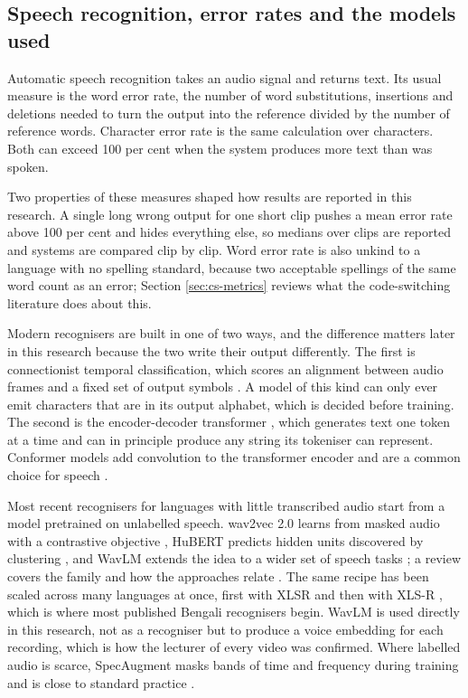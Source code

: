 \subsection{Speech recognition, error rates and the models used}

Automatic speech recognition takes an audio signal and returns text. Its usual measure is
the word error rate, the number of word substitutions, insertions and deletions needed to
turn the output into the reference divided by the number of reference words. Character
error rate is the same calculation over characters. Both can exceed 100 per cent when the
system produces more text than was spoken.

Two properties of these measures shaped how results are reported in this research. A single
long wrong output for one short clip pushes a mean error rate above 100 per cent and
hides everything else, so medians over clips are reported and systems are compared clip
by clip. Word error rate is also unkind to a language with no spelling standard, because
two acceptable spellings of the same word count as an error; Section \ref{sec:cs-metrics} reviews what
the code-switching literature does about this.

Modern recognisers are built in one of two ways, and the difference matters later in this
research because the two write their output differently. The first is connectionist temporal
classification, which scores an alignment between audio frames and a fixed set of output
symbols \cite{graves2006ctc}. A model of this kind can only ever emit characters that are
in its output alphabet, which is decided before training. The second is the encoder-decoder
transformer \cite{vaswani2017attention}, which generates text one token at a time and can
in principle produce any string its tokeniser can represent. Conformer models add
convolution to the transformer encoder and are a common choice for speech
\cite{gulati2020conformer}.

Most recent recognisers for languages with little transcribed audio start from a model
pretrained on unlabelled speech. wav2vec 2.0 learns from masked audio with a contrastive
objective \cite{baevski2020wav2vec2}, HuBERT predicts hidden units discovered by
clustering \cite{hsu2021hubert}, and WavLM extends the idea to a wider set of speech tasks
\cite{chen2022wavlm}; a review covers the family and how the approaches relate
\cite{mohamed2022sslreview}. The same recipe has been scaled across many languages at once,
first with XLSR \cite{conneau2021xlsr} and then with XLS-R \cite{babu2022xlsr2}, which is
where most published Bengali recognisers begin. WavLM is used directly in this research, not
as a recogniser but to produce a voice embedding for each recording, which is how the
lecturer of every video was confirmed. Where labelled audio is scarce, SpecAugment masks
bands of time and frequency during training and is close to standard practice
\cite{park2019specaugment}.

